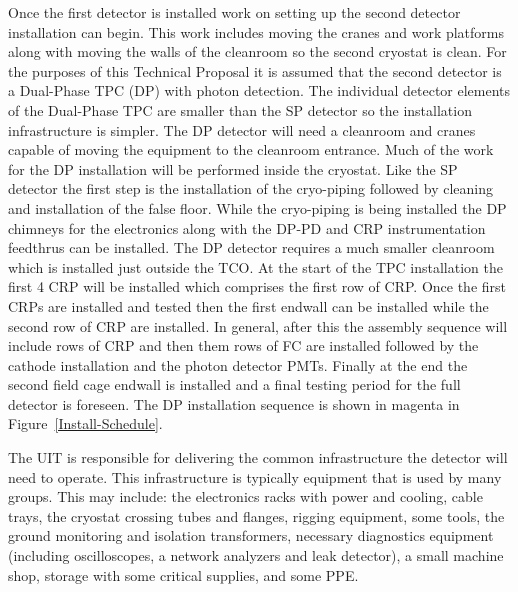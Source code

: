 Once the first detector is installed work on setting up the second
detector installation can begin. This work includes moving the cranes
and work platforms along with moving the walls of the cleanroom so the
second cryostat is clean. For the purposes of this Technical Proposal
it is assumed that the second detector is a Dual-Phase TPC (DP) with
photon detection. The individual detector elements of the Dual-Phase
TPC are smaller than the SP detector so the installation
infrastructure is simpler. The DP detector will need a cleanroom and
cranes capable of moving the equipment to the cleanroom entrance. Much
of the work for the DP installation will be performed inside the
cryostat. Like the SP detector the first step is the installation of
the cryo-piping followed by cleaning and installation of the false
floor. While the cryo-piping is being installed the DP chimneys for
the electronics along with the DP-PD and CRP instrumentation feedthrus
can be installed. The DP detector requires a much smaller cleanroom
which is installed just outside the TCO. At the start of the TPC
installation the first 4 CRP will be installed which comprises the
first row of CRP. Once the first CRPs are installed and tested then
the first endwall can be installed while the second row of CRP are
installed. In general, after this the assembly sequence will include rows of
CRP and then them rows of FC are installed
followed by the cathode installation and the photon detector
PMTs. Finally at the end the second field cage endwall is installed
and a final testing period for the full detector is foreseen. The DP
installation sequence is shown in magenta in Figure~\ref{Install-Schedule}.

The UIT is responsible for delivering the common infrastructure
the detector will need to operate. This infrastructure is typically
equipment that is used by many groups. This may include: the
electronics racks with power and cooling, cable trays, the cryostat
crossing tubes and flanges, rigging equipment, some tools, the ground
monitoring and isolation transformers, necessary diagnostics equipment
(including oscilloscopes, a network analyzers and leak detector), a
small machine shop, storage with some critical supplies, and some PPE.

